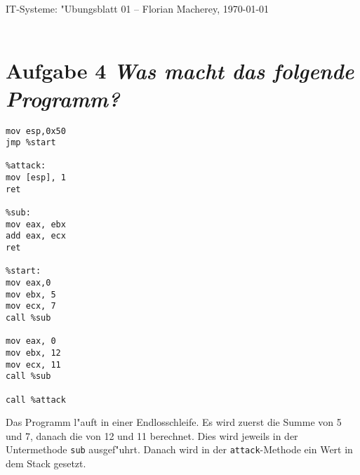 \documentclass{article}
\begin{document}
{\Large \centering \textsf{IT-Systeme: "Ubungsblatt 01} -- Florian Macherey, \today}\\
\noindent\makebox[\linewidth]{\rule{\textwidth}{0.2pt}} \\

\section*{Aufgabe 4 \textit{Was macht das folgende Programm?}}
\begin{lstlisting}
mov esp,0x50
jmp %start

%attack: 
mov [esp], 1
ret
           
%sub:
mov eax, ebx
add eax, ecx
ret
                        
%start:
mov eax,0
mov ebx, 5
mov ecx, 7
call %sub
                                                
mov eax, 0
mov ebx, 12
mov ecx, 11
call %sub
                                                                    
call %attack
\end{lstlisting}
Das Programm l"auft in einer Endlosschleife. Es wird zuerst die Summe von 5 und 7, danach die von 12 und 11 berechnet. Dies wird jeweils in der Untermethode \texttt{sub} ausgef"uhrt. Danach wird in der \texttt{attack}-Methode ein Wert in dem Stack gesetzt. 
\end{document}
